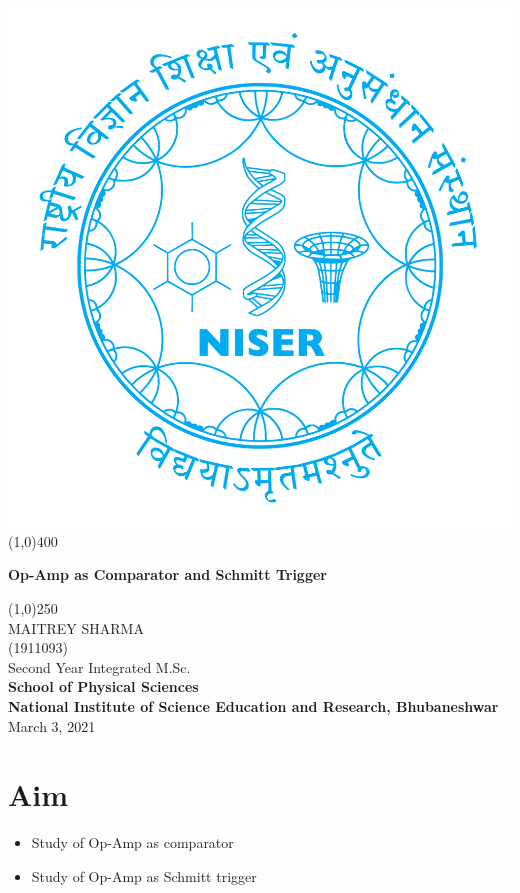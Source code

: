 \begin{titlepage}
\begin{center}
\includegraphics[scale=0.15]{OPAMP Apps/niser.png}
\line(1,0){400}\\
[2mm]
\begin{large}
\textbf{\huge Op-Amp as Comparator and Schmitt Trigger}\\ 
\end{large}
\line(1,0){250}\\
[5cm]
\large MAITREY SHARMA\\
\small (1911093)\\
[4.5cm]
Second Year Integrated M.Sc.\\
\textbf{School of Physical Sciences}\\
\textbf{National Institute of Science Education and Research, Bhubaneshwar}\\
\small March 3, 2021
\end{center} 
\end{titlepage}
\newpage
\section{Aim}
\begin{itemize}
    \item Study of Op-Amp as comparator
    \item Study of Op-Amp as Schmitt trigger
\end{itemize}
